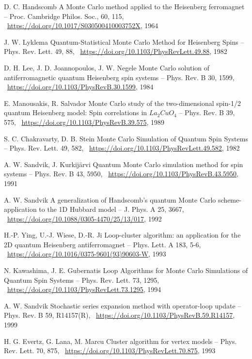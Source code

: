 \documentclass[11pt]{article}
\begin{document}
\begin{thebibliography}{3}
D. C. Handscomb A Monte Carlo method applied to the Heisenberg ferromagnet -- Proc. Cambridge Philos. Soc., 60, 115,  ~\url{https://doi.org/10.1017/S030500410003752X}, 1964

J. W. Lyklema Quantum-Statistical Monte Carlo Method for Heisenberg Spins -- Phys. Rev. Lett. 49, 88,  ~\url{https://doi.org/10.1103/PhysRevLett.49.88}, 1982

 D. H. Lee, J. D. Joannopoulos, J. W. Negele Monte Carlo solution of antiferromagnetic quantum Heisenberg spin systems -- Phys. Rev. B 30, 1599,  ~\url{https://doi.org/10.1103/PhysRevB.30.1599}, 1984

 E. Manousakis, R. Salvador Monte Carlo study of the two-dimensional spin-1/2 quantum Heisenberg model: Spin correlations in $La_2CuO_4$ -- Phys. Rev. B 39, 575,  ~\url{https://doi.org/10.1103/PhysRevB.39.575}, 1989

S. C. Chakravarty, D. B. Stein Monte Carlo Simulation of Quantum Spin Systems -- Phys. Rev. Lett. 49, 582,  ~\url{https://doi.org/10.1103/PhysRevLett.49.582}, 1982

A. W. Sandvik, J. Kurkijärvi Quantum Monte Carlo simulation method for spin systems -- Phys. Rev. B 43, 5950,  ~\url{https://doi.org/10.1103/PhysRevB.43.5950}, 1991

A. W. Sandvik A generalization of Handscomb's quantum Monte Carlo scheme-application to the 1D Hubbard model -- J. Phys. A 25, 3667,  ~\url{https://doi.org/10.1088/0305-4470/25/13/017}, 1992

H.-P. Ying, U.-J. Wiese, D.-R. Ji Loop-cluster algorithm: an application for the 2D quantum Heisenberg antiferromagnet -- Phys. Lett. A 183, 5-6,  ~\url{https://doi.org/10.1016/0375-9601(93)90603-W}, 1993

N. Kawashima, J. E. Gubernatis Loop Algorithms for Monte Carlo Simulations of Quantum Spin Systems -- Phys. Rev. Lett. 73, 1295,  ~\url{https://doi.org/10.1103/PhysRevLett.73.1295}, 1994

A. W. Sandvik Stochastic series expansion method with operator-loop update -- Phys. Rev. B 59, R14157(R),  ~\url{https://doi.org/10.1103/PhysRevB.59.R14157}, 1999

H. G. Evertz, G. Lana, M. Marcu Cluster algorithm for vertex models -- Phys. Rev. Lett. 70, 875,  ~\url{https://doi.org/10.1103/PhysRevLett.70.875}, 1993


\end{thebibliography}
\end{document}
